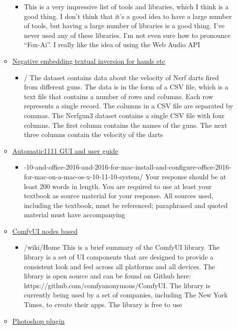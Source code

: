 \begin{itemize}
\begin{itemize}
    \begin{itemize}
    \tightlist
    \item
      This is a very impressive list of tools and libraries, which I
      think is a good thing. I don't think that it's a good idea to have
      a large number of tools, but having a large number of libraries is
      a good thing. I've never used any of these libraries. I'm not even
      sure how to pronounce ``Fox-Ai''. I really like the idea of using
      the Web Audio API
    \end{itemize}
  \item
    \href{https://huggingface.co/datasets/Nerfgun3/bad_prompt}{Negative
    embedding textual inversion for hands etc}

    \begin{itemize}
    \tightlist
    \item
      / The dataset contains data about the velocity of Nerf darts fired
      from different guns. The data is in the form of a CSV file, which
      is a text file that contains a number of rows and columns. Each
      row represents a single record. The columns in a CSV file are
      separated by commas. The Nerfgun3 dataset contains a single CSV
      file with four columns. The first column contains the names of the
      guns. The next three columns contain the velocity of the darts
    \end{itemize}
  \item
    \href{https://www.thosesixfaces.com/post/stable-diffusion-getting-started-windows}{Automatic1111
    GUI and user guide}

    \begin{itemize}
    \tightlist
    \item
      -10-and-office-2016-and-2016-for-mac-install-and-configure-office-2016-for-mac-on-a-mac-os-x-10-11-10-system/
      Your response should be at least 200 words in length. You are
      required to use at least your textbook as source material for your
      response. All sources used, including the textbook, must be
      referenced; paraphrased and quoted material must have accompanying
    \end{itemize}
  \item
    \href{https://github.com/comfyanonymous/ComfyUI}{ComfyUI nodes
    based}

    \begin{itemize}
    \tightlist
    \item
      /wiki/Home This is a brief summary of the ComfyUI library. The
      library is a set of UI components that are designed to provide a
      consistent look and feel across all platforms and all devices. The
      library is open source and can be found on Github here:
      https://github.com/comfyanonymous/ComfyUI. The library is
      currently being used by a set of companies, including The New York
      Times, to create their apps. The library is free to use
    \end{itemize}
  \item
    \href{https://christiancantrell.com/\#ai-ml}{Photoshop plugin}


\end{itemize}
\end{itemize}

